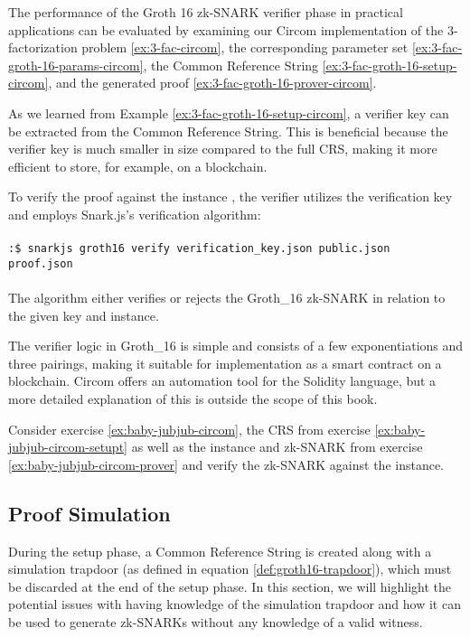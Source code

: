 \begin{example}
\label{ex:3-fac-groth-16-verifier-circom} The performance of the Groth 16 zk-SNARK verifier phase in practical applications can be evaluated by examining our Circom implementation of the 3-factorization problem \ref{ex:3-fac-circom}, the corresponding parameter set \ref{ex:3-fac-groth-16-params-circom}, the Common Reference String \ref{ex:3-fac-groth-16-setup-circom}, and the generated proof \ref{ex:3-fac-groth-16-prover-circom}.

As we learned from Example \ref{ex:3-fac-groth-16-setup-circom}, a verifier key can be extracted from the Common Reference String. This is beneficial because the verifier key is much smaller in size compared to the full CRS, making it more efficient to store, for example, on a blockchain.

To verify the proof  against the instance , the verifier utilizes the verification key  and employs Snark.js's verification algorithm:
\\
\\
\texttt{:\$ snarkjs groth16 verify verification\_key.json public.json \\ proof.json}
\\
\\
The algorithm either verifies or rejects the Groth\_16 zk-SNARK in relation to the given key and instance. 

The verifier logic in Groth\_16 is simple and consists of a few exponentiations and three pairings, making it suitable for implementation as a smart contract on a blockchain. Circom offers an automation tool for the Solidity language, but a more detailed explanation of this is outside the scope of this book.
\end{example} 

\begin{exercise} 
\label{ex:baby-jubjub-circom-verifier}
Consider exercise \ref{ex:baby-jubjub-circom}, the CRS from exercise \ref{ex:baby-jubjub-circom-setupt} as well as the instance and zk-SNARK from exercise \ref{ex:baby-jubjub-circom-prover} and verify the zk-SNARK against the instance.
\end{exercise}

\subsection{Proof Simulation}
\label{sec:proof_simulation} During the setup phase, a Common Reference String is created along with a simulation trapdoor (as defined in equation \eqref{def:groth16-trapdoor}), which must be discarded at the end of the setup phase. In this section, we will highlight the potential issues with having knowledge of the simulation trapdoor and how it can be used to generate zk-SNARKs without any knowledge of a valid witness.

